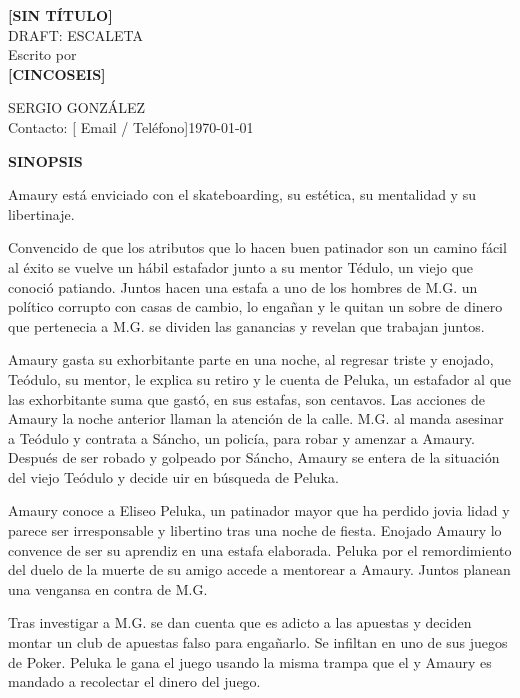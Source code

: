\documentclass[12pt,letterpaper]{article}
\begin{document}
\RaggedRight

\thispagestyle{empty}
\vspace*{2.5in}
\begin{center}
    {\Huge \textbf{[SIN TÍTULO]}}\\[1cm]
    {\large DRAFT: ESCALETA}\\[2cm]
    Escrito por\\
    \textbf{[CINCOSEIS]}
\end{center}

\vfill
\noindent SERGIO GONZÁLEZ\\
Contacto: [ Email / Teléfono]\hfill \today
\newpage
\newpage

\pagestyle{plain}
\setcounter{page}{1}

\setlength{\parskip}{\baselineskip} 

\textbf{SINOPSIS}

Amaury está enviciado con el skateboarding, su estética, su mentalidad y su libertinaje.

Convencido de que los atributos que lo hacen buen patinador son un camino fácil al éxito se vuelve un hábil estafador junto a su mentor Tédulo, un viejo que conoció patiando. Juntos hacen una estafa a uno de los hombres de M.G. un político corrupto con casas de cambio, lo engañan y le quitan un sobre de dinero que pertenecia a M.G. se dividen las ganancias y revelan que trabajan juntos.

Amaury gasta su exhorbitante parte en una noche, al regresar triste y enojado, Teódulo, su mentor, le explica su retiro y le cuenta de Peluka, un estafador al que las exhorbitante suma que gastó, en sus estafas, son centavos. Las acciones de Amaury la noche anterior llaman la atención de la calle. M.G. al manda asesinar a Teódulo y contrata a Sáncho, un policía, para robar y amenzar a Amaury. Después de ser robado y golpeado por Sáncho, Amaury se entera de la situación del viejo Teódulo y decide uir en búsqueda de Peluka.

Amaury conoce a Eliseo Peluka, un patinador mayor que ha perdido jovia lidad y parece ser irresponsable y libertino tras una noche de fiesta. Enojado Amaury lo convence de ser su aprendiz en una estafa elaborada. Peluka por el remordimiento del duelo de la muerte de su amigo accede a mentorear a Amaury. Juntos planean una vengansa en contra de M.G.

Tras investigar a M.G. se dan cuenta que es adicto a las apuestas y deciden montar un club de apuestas falso para engañarlo. Se infiltan en uno de sus juegos de Poker. Peluka le gana el juego usando la misma trampa que el y Amaury es mandado a recolectar el dinero del juego.
\end{document}
